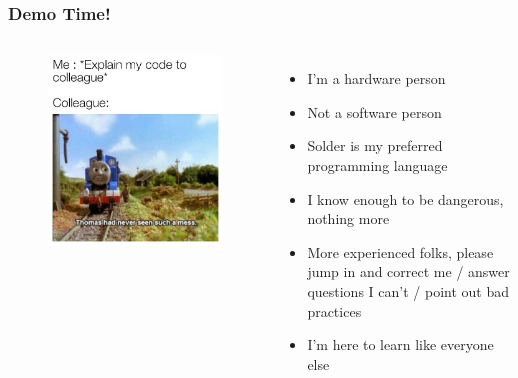 \documentclass[t]{beamer}
\begin{document}

\begin{frame}[t]
\frametitle{Demo Time!}
\begin{columns}
	\begin{figure}
		\includegraphics[scale=0.35]{thomasTankCode.jpg}
	\end{figure}	
	\begin{itemize}
		\item I'm a hardware person
		\item Not a software person
		\item Solder is my preferred programming language
		\item I know enough to be dangerous, nothing more
		\item More experienced folks, please jump in and correct me / answer questions I can't / point out bad practices
		\item I'm here to learn like everyone else
	\end{itemize}
	
\end{columns}


\end{frame}
\end{document}
